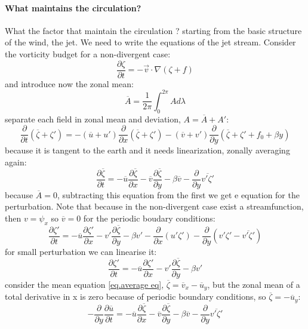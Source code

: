 \paragraph{What maintains the circulation?} What the factor that maintain the circulation ? starting from the basic structure of the wind, the jet. We need to write the equations of the jet stream. Consider the vorticity budget for a non-divergent case:
\begin{equation}
	\frac{\partial\zeta}{\partial t}=-\vec{v}\cdot\nabla(\zeta+f)
\end{equation}
and introduce now the zonal mean:
\begin{equation}\label{eq.zonal mean}
\overline{A}=\frac{1}{2\pi}\int_0^{2\pi}Ad\lambda
\end{equation}
separate each field in zonal mean and deviation, $A=\overline{A}+A'$:
$$\frac{\partial}{\partial t}(\overline{\zeta}+\zeta')=-(\overline{u}+u')\frac{\partial}{\partial x}(\overline{\zeta}+\zeta')-(\overline{v}+v')\frac{\partial}{\partial y}(\overline{\zeta}+\zeta'+f_0+\beta y)$$
because it is tangent to the earth and it needs linearization, zonally averaging again:
\begin{equation}\label{eq.average eq}
\frac{\partial\overline{\zeta}}{\partial t}=-\overline{u}\frac{
	\partial\overline{\zeta}
}{\partial x}-\overline{v}\frac{\partial\overline{\zeta}}{\partial y}-\beta \overline{v}-\frac{\partial}{\partial y}\overline{v'\zeta'}
\end{equation}
because $\overline{A}=0$, subtracting this equation from the first we get e equation for the perturbation. Note that because in the non-divergent case exist a streamfunction, then $v=\psi_x$ so $\overline{v}=0$ for the periodic boudary conditions:
$$\frac{\partial\zeta'}{\partial t}=-\overline{u}\frac{\partial\zeta'}{\partial x}-v'\frac{\partial\overline{\zeta}}{\partial y}-\beta v'-\frac{\partial}{\partial x}(u'\zeta')-\frac{\partial}{\partial y}(v'\zeta'-\overline{v'\zeta'})$$ for small perturbation we can linearise it:
\begin{equation}
	\frac{\partial\zeta'}{\partial t}=-\overline{u}\frac{\partial\zeta'}{\partial x}-v'\frac{\partial\overline{\zeta}}{\partial y}-\beta v'
\end{equation}
consider the mean equation \ref{eq.average eq}, $\overline{\zeta}=\overline{v}_x-\overline{u}_y$, but the zonal mean of a total derivative in x is zero because of periodic boundary conditions, so $\overline{\zeta}=-\overline{u}_y$:
$$-\frac{\partial}{\partial y}\frac{\partial\overline{u}}{\partial t}=-\overline{u}\frac{\partial\overline{\zeta}}{\partial x}-\overline{v}\frac{\partial\overline{\zeta}}{\partial y}-\beta\overline{v}-\frac{\partial}{\partial y}\overline{v'\zeta'}$$
